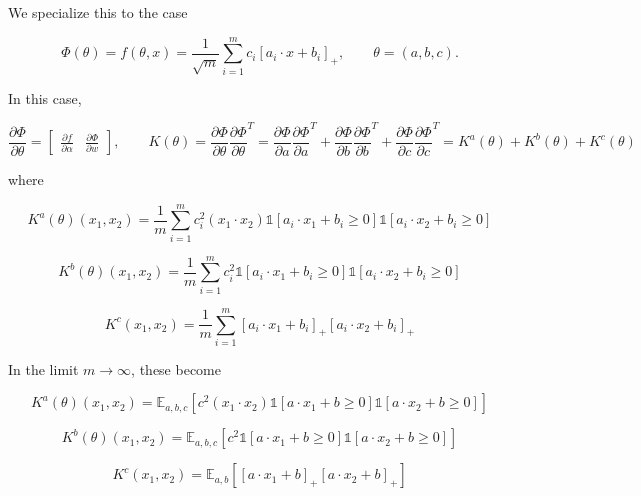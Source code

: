 \documentclass{article}
\begin{document}
We specialize this to the case

\begin{equation}
\Phi(\theta) = f(\theta,x) = \frac 1 {\sqrt m} \sum_{i=1}^m c_i
[a_i \cdot x + b_i]_+,
\qquad \theta = (a, b, c).
\end{equation}

In this case,


\begin{equation}
\frac{\partial \Phi}{\partial \theta} = \begin{bmatrix}
    \frac{\partial f}{\partial \alpha} & \frac{\partial \Phi}{\partial w}
\end{bmatrix}, \qquad K(\theta) = \frac{\partial \Phi}{\partial \theta} 
\frac{\partial \Phi}{\partial \theta}^T = \frac{\partial \Phi}{\partial a} 
\frac{\partial \Phi}{\partial a}^T + \frac{\partial \Phi}{\partial b} 
\frac{\partial \Phi}{\partial b}^T + \frac{\partial \Phi}{\partial c} 
\frac{\partial \Phi}{\partial c}^T= K^a(\theta) + K^b(\theta) + K^c(\theta)
\end{equation}

where

\begin{equation}
K^a(\theta)(x_1,x_2) = \frac 1 m \sum_{i=1}^m c_i^2 (x_1\cdot x_2) \mathds 1 
[a_i
\cdot x_1 + b_i \ge 0] \mathds 1 [a_i
\cdot x_2 + b_i \ge 0]
\end{equation}

\begin{equation}
K^b(\theta)(x_1,x_2) = \frac 1 m \sum_{i=1}^m c_i^2 \mathds 1 
[a_i
\cdot x_1 + b_i \ge 0] \mathds 1 [a_i
\cdot x_2 + b_i \ge 0]
\end{equation}

\begin{equation}
K^c(x_1,x_2) = \frac 1 m \sum_{i=1}^m [a_i\cdot x_1 + b_i]_+ [a_i\cdot x_2 +
b_i]_+
\end{equation}



In the limit $m \rightarrow \infty$, these become

\begin{equation}
K^a(\theta)(x_1,x_2) = \mathbb E_{a,b,c}[c^2 (x_1\cdot x_2) \mathds 1 
[a
\cdot x_1 + b \ge 0] \mathds 1 [a
\cdot x_2 + b \ge 0]]
\end{equation}

\begin{equation}
K^b(\theta)(x_1,x_2) = \mathbb E_{a,b,c} [c^2 \mathds 1 
[a
\cdot x_1 + b \ge 0] \mathds 1 [a
\cdot x_2 + b \ge 0]]
\end{equation}

\begin{equation}
K^c(x_1,x_2) = \mathbb E_{a,b} [[a\cdot x_1 + b]_+ [a\cdot x_2 +
b]_+]
\end{equation}
\end{document}
